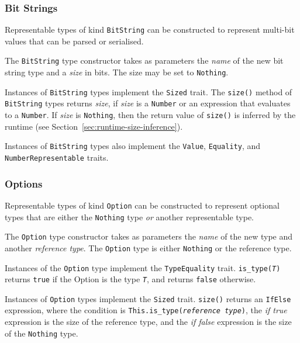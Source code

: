 \documentclass[10pt,twocolumn,a4paper]{article}
\newcommand{\code}[1]{\texttt{#1}}
\begin{document}
\subsubsection{Bit Strings}
\label{sec:bit-string}

Representable types of kind \code{BitString} can be constructed to
represent multi-bit values that can be parsed or serialised.

The \code{BitString} type constructor takes as parameters the \emph{name}
of the new bit string type and a \emph{size} in bits. The size may be
set to \code{Nothing}.

Instances of \code{BitString} types implement the \code{Sized} trait. The
\code{size()} method of \code{BitString} types returns \emph{size}, if
\emph{size} is a \code{Number} or an expression that evaluates to a
\code{Number}. If \emph{size} is \code{Nothing}, then the return value of
\code{size()} is inferred by the runtime (see
Section~\ref{sec:runtime-size-inference}).

Instances of \code{BitString} types also implement the \code{Value},
\code{Equality}, and \code{NumberRepresentable} traits.

\subsubsection{Options}
\label{sec:option-type}

Representable types of kind \code{Option} can be constructed to represent
optional types that are either the \code{Nothing} type \emph{or} another
representable type.

The \code{Option} type constructor takes as parameters the \emph{name} of the
new type and another \emph{reference type}. The \code{Option} type is either
\code{Nothing} or the reference type.

Instances of the \code{Option} type implement the \code{TypeEquality} trait.
\code{is\_type(\emph{T})} returns \code{true} if the Option is the type
\code{\emph{T}}, and returns \code{false} otherwise.

Instances of \code{Option} types implement the \code{Sized} trait. \code{size()}
returns an \code{IfElse} expression, where the condition is
\code{This.is\_type(\emph{reference type})}, the \emph{if true} expression is
the size of the reference type, and the \emph{if false} expression is the size
of the \code{Nothing} type.
\end{document}
